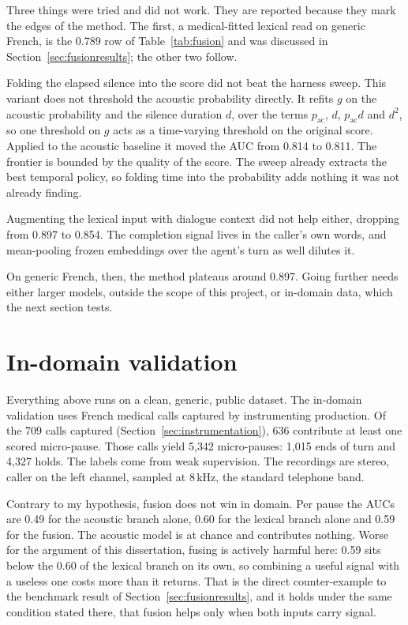 Three things were tried and did not work. They are reported because they mark the edges of
the method. The first, a medical-fitted lexical read on generic French, is the 0.789 row of
Table~\ref{tab:fusion} and was discussed in Section~\ref{sec:fusionresults}; the other two
follow.

Folding the elapsed silence into the score did not beat the harness sweep. This variant does not
threshold the acoustic probability directly. It refits $g$ on the acoustic
probability and the silence duration $d$, over the terms $p_{\mathrm{ac}}$, $d$,
$p_{\mathrm{ac}}d$ and $d^{2}$, so one threshold on $g$ acts as a time-varying threshold on
the original score. Applied to the
acoustic baseline it moved the AUC from 0.814 to 0.811. The frontier is bounded by the quality of the score.
The sweep already extracts the best temporal policy, so folding time into the probability
adds nothing it was not already finding.

Augmenting the lexical input with dialogue context did not help either, dropping from 0.897
to 0.854. The completion signal lives in the caller's own words, and mean-pooling frozen
embeddings over the agent's turn as well dilutes it.

On generic French, then, the method plateaus around 0.897. Going
further needs either larger models, outside the scope of this project, or in-domain data,
which the next section tests.

\section{In-domain validation}
\label{sec:gold}

Everything above runs on a clean, generic, public dataset. The in-domain validation uses
French medical calls captured by instrumenting production. Of the 709 calls captured
(Section~\ref{sec:instrumentation}), 636 contribute at least one scored micro-pause. Those
calls yield 5{,}342 micro-pauses: 1{,}015 ends of turn and 4{,}327 holds. The labels come
from weak supervision. The recordings are stereo, caller on the left channel, sampled at 8\,kHz, the
standard telephone band.

Contrary to my hypothesis, fusion does not win in domain. Per pause the AUCs are 0.49 for
the acoustic branch alone, 0.60 for the lexical branch alone and 0.59 for the fusion. The acoustic model is at chance and contributes nothing. Worse for the argument of this
dissertation, fusing is actively harmful here: 0.59 sits below the 0.60 of the lexical
branch on its own, so combining a useful signal with a useless one costs more than it
returns. That is the direct counter-example to the benchmark result of
Section~\ref{sec:fusionresults}, and it holds under the same condition stated there, that
fusion helps only when both inputs carry signal.

